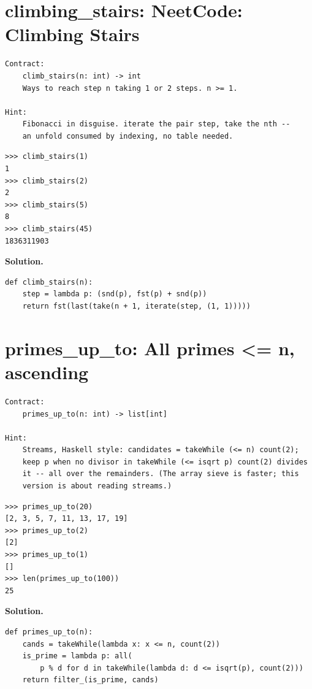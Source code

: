 \documentclass[10pt,letterpaper]{book}
\begin{document}
\section{climbing\_stairs: NeetCode: Climbing Stairs}
\begin{lstlisting}[style=ex]
Contract:
    climb_stairs(n: int) -> int
    Ways to reach step n taking 1 or 2 steps. n >= 1.

Hint:
    Fibonacci in disguise. iterate the pair step, take the nth --
    an unfold consumed by indexing, no table needed.
\end{lstlisting}
\begin{lstlisting}[style=ex]
>>> climb_stairs(1)
1
>>> climb_stairs(2)
2
>>> climb_stairs(5)
8
>>> climb_stairs(45)
1836311903
\end{lstlisting}
\noindent\textbf{Solution.}
\begin{lstlisting}[style=code]
def climb_stairs(n):
    step = lambda p: (snd(p), fst(p) + snd(p))
    return fst(last(take(n + 1, iterate(step, (1, 1)))))
\end{lstlisting}

\section{primes\_up\_to: All primes <= n, ascending}
\begin{lstlisting}[style=ex]
Contract:
    primes_up_to(n: int) -> list[int]

Hint:
    Streams, Haskell style: candidates = takeWhile (<= n) count(2);
    keep p when no divisor in takeWhile (<= isqrt p) count(2) divides
    it -- all over the remainders. (The array sieve is faster; this
    version is about reading streams.)
\end{lstlisting}
\begin{lstlisting}[style=ex]
>>> primes_up_to(20)
[2, 3, 5, 7, 11, 13, 17, 19]
>>> primes_up_to(2)
[2]
>>> primes_up_to(1)
[]
>>> len(primes_up_to(100))
25
\end{lstlisting}
\noindent\textbf{Solution.}
\begin{lstlisting}[style=code]
def primes_up_to(n):
    cands = takeWhile(lambda x: x <= n, count(2))
    is_prime = lambda p: all(
        p % d for d in takeWhile(lambda d: d <= isqrt(p), count(2)))
    return filter_(is_prime, cands)
\end{lstlisting}
\end{document}
